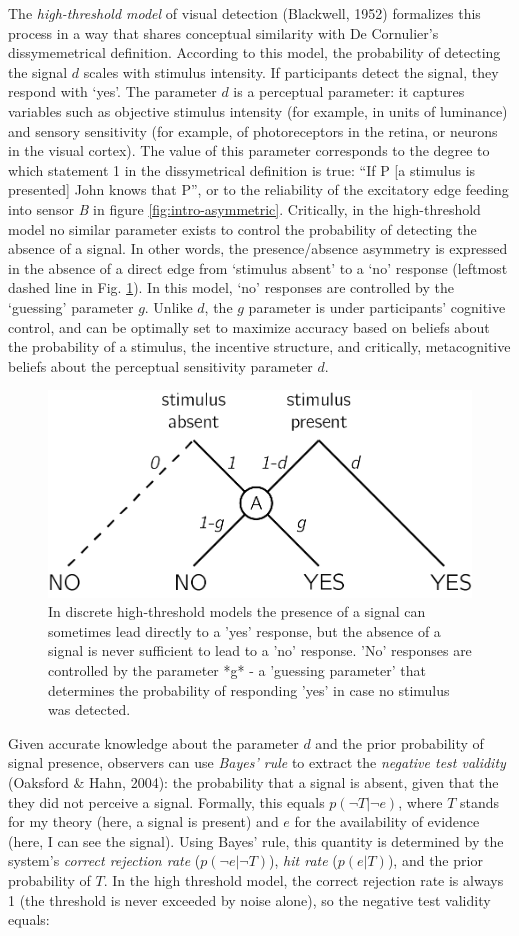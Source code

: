 \documentclass[12pt,twoside]{reedthesis}
\begin{document}
The \emph{high-threshold model} of visual detection (Blackwell, 1952) formalizes this process in a way that shares conceptual similarity with De Cornulier's dissymemetrical definition. According to this model, the probability of detecting the signal \(d\) scales with stimulus intensity. If participants detect the signal, they respond with `yes'. The parameter \(d\) is a perceptual parameter: it captures variables such as objective stimulus intensity (for example, in units of luminance) and sensory sensitivity (for example, of photoreceptors in the retina, or neurons in the visual cortex). The value of this parameter corresponds to the degree to which statement 1 in the dissymetrical definition is true: ``If P {[}a stimulus is presented{]} John knows that P'', or to the reliability of the excitatory edge feeding into sensor \emph{B} in figure \ref{fig:intro-asymmetric}. Critically, in the high-threshold model no similar parameter exists to control the probability of detecting the absence of a signal. In other words, the presence/absence asymmetry is expressed in the absence of a direct edge from `stimulus absent' to a `no' response (leftmost dashed line in Fig. \ref{fig:intro-htm}). In this model, `no' responses are controlled by the `guessing' parameter \(g\). Unlike \(d\), the \(g\) parameter is under participants' cognitive control, and can be optimally set to maximize accuracy based on beliefs about the probability of a stimulus, the incentive structure, and critically, metacognitive beliefs about the perceptual sensitivity parameter \(d\).
\begin{figure}
\includegraphics[width=0.7\linewidth]{figure/intro/htm} \caption{In discrete high-threshold models the presence of a signal can sometimes lead directly to a 'yes' response, but the absence of a signal is never sufficient to lead to a 'no' response. 'No' responses are controlled by the parameter *g* - a 'guessing parameter' that determines the probability of responding 'yes' in case no stimulus was detected.}\label{fig:intro-htm}
\end{figure}
Given accurate knowledge about the parameter \(d\) and the prior probability of signal presence, observers can use \emph{Bayes' rule} to extract the \emph{negative test validity} (Oaksford \& Hahn, 2004): the probability that a signal is absent, given that the they did not perceive a signal. Formally, this equals \(p(\neg T|\neg e)\), where \(T\) stands for my theory (here, a signal is present) and \(e\) for the availability of evidence (here, I can see the signal). Using Bayes' rule, this quantity is determined by the system's \emph{correct rejection rate} (\(p(\neg e|\neg T)\)), \emph{hit rate} (\(p(e|T)\)), and the prior probability of \(T\). In the high threshold model, the correct rejection rate is always 1 (the threshold is never exceeded by noise alone), so the negative test validity equals:
\end{document}

